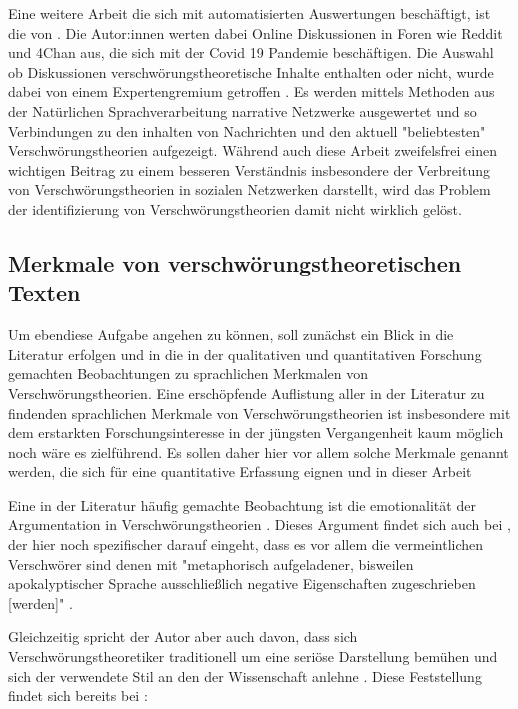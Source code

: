 Eine weitere Arbeit die sich mit automatisierten Auswertungen beschäftigt, ist die von \textcite{shahsavari_2020}.
Die Autor:innen werten dabei Online Diskussionen in Foren wie Reddit und 4Chan aus, die sich mit der Covid 19 Pandemie beschäftigen.
Die Auswahl ob Diskussionen verschwörungstheoretische Inhalte enthalten oder nicht, wurde dabei von einem Expertengremium getroffen \parencite[284f]{shahsavari_2020}.
Es werden mittels Methoden aus der Natürlichen Sprachverarbeitung narrative Netzwerke ausgewertet und so Verbindungen zu den inhalten von Nachrichten und den aktuell "beliebtesten" Verschwörungstheorien aufgezeigt. 
Während auch diese Arbeit zweifelsfrei einen wichtigen Beitrag zu einem besseren Verständnis insbesondere der Verbreitung von Verschwörungstheorien in sozialen Netzwerken darstellt, wird das Problem der identifizierung von Verschwörungstheorien damit nicht wirklich gelöst.

\subsection{Merkmale von verschwörungstheoretischen Texten}

Um ebendiese Aufgabe angehen zu können, soll zunächst ein Blick in die Literatur erfolgen und in die in der qualitativen und quantitativen Forschung gemachten Beobachtungen zu sprachlichen Merkmalen von Verschwörungstheorien.
Eine erschöpfende Auflistung aller in der Literatur zu findenden sprachlichen Merkmale von Verschwörungstheorien ist insbesondere mit dem erstarkten Forschungsinteresse in der jüngsten Vergangenheit kaum möglich noch wäre es zielführend.
Es sollen daher hier vor allem solche Merkmale genannt werden, die sich für eine quantitative Erfassung eignen und in dieser Arbeit 

Eine in der Literatur häufig gemachte Beobachtung ist die emotionalität der Argumentation in Verschwörungstheorien \parencite[Vgl.][10]{miller_2002}.
Dieses Argument findet sich auch bei \textcite[][93ff]{butter_2018}, der hier noch spezifischer darauf eingeht, dass es vor allem die vermeintlichen Verschwörer sind denen mit "metaphorisch aufgeladener, bisweilen apokalyptischer Sprache ausschließlich negative Eigenschaften zugeschrieben [werden]" \parencite[][93f]{butter_2018}.

Gleichzeitig spricht der Autor aber auch davon, dass sich Verschwörungstheoretiker traditionell um eine seriöse Darstellung bemühen und sich der verwendete Stil an den der Wissenschaft anlehne \parencite[][61]{butter_2018}.
Diese Feststellung findet sich bereits bei \textcite{hofstadter_2008}:


